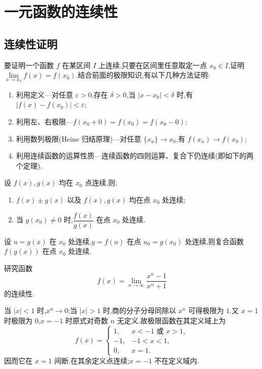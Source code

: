 \setcounter{chapter}{2}
\pagestyle{fancy}

\chapter{一元函数的连续性}


\section{连续性证明}

要证明一个函数 $f$ 在某区间 $I$ 上连续,只要在区间里任意取定一点 $x_0\in I$,证明 $\displaystyle\lim\limits_{x\to x_0}f(x)=f(x_0)$.结合前面的极限知识,有以下几种方法证明:
\begin{enumerate}
    \item 利用定义---对任意 $\varepsilon>0$,存在 $\delta>0$,当 $|x-x_0|<\delta$ 时,有 $|f(x)-f(x_0)|<\varepsilon$;
    \item 利用左、右极限---$f(x_0+0)=f(x_0)=f(x_0-0)$;
    \item 利用数列极限(Heine 归结原理)---对任意 $\{x_n\}\to x_0$,有 $f(x_n)\to f(x_0)$;
    \item 利用连续函数的运算性质---连续函数的四则运算、复合下仍连续(即如下的两个定理).
\end{enumerate}

\begin{theorem}[\markstar]
    设 $f(x),g(x)$ 均在 $x_0$ 点连续,则:
    \begin{enumerate}
        \item $f(x)\pm g(x)$ 以及 $f(x),g(x)$ 均在点 $x_0$ 处连续;
        \item 当 $g(x_0)\neq0$ 时,$\dfrac{f(x)}{g(x)}$ 在点 $x_0$ 处连续.
    \end{enumerate}
\end{theorem}

\begin{theorem}[\markstar]
    设 $u=g(x)$ 在 $x_0$ 处连续,$y=f(u)$ 在点 $u_0=g(x_0)$ 处连续,则复合函数 $f(g(x))$ 在点 $x_0$ 处连续.
\end{theorem}

\begin{example}
    研究函数
    \[
        f(x)=\lim\limits_{n\to\infty}\dfrac{x^n-1}{x^n+1}
    \]
    的连续性.
\end{example}
\exampleblank

\begin{solution}
    当 $|x|<1$ 时,$x^n\to0$;当 $|x|>1$ 时,商的分子分母同除以 $x^n$ 可得极限为 $1$.又 $x=1$ 时极限为 $0$,$x=-1$ 时原式对奇数 $n$ 无定义.故极限函数在其定义域上为
    \[
        f(x)=
        \begin{cases}
            1,  & x<-1\text{ 或 }x>1, \\
            -1, & -1<x<1,            \\
            0,  & x=1.
        \end{cases}
    \]
    因而它在 $x=1$ 间断,在其余定义点连续;$x=-1$ 不在定义域内.
\end{solution}

